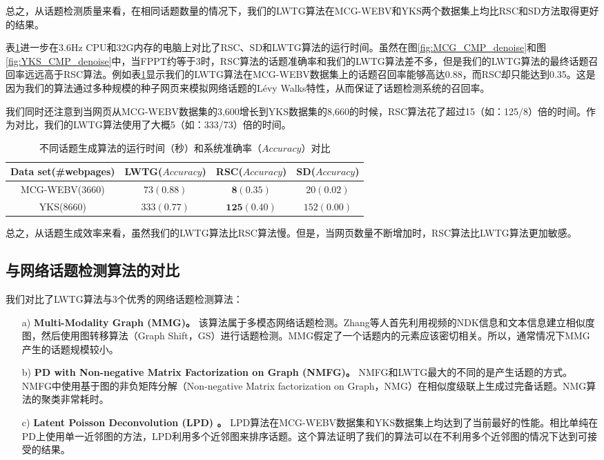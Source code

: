总之，从话题检测质量来看，在相同话题数量的情况下，我们的LWTG算法在MCG-WEBV和YKS两个数据集上均比RSC和SD方法取得更好的结果。

表\ref{tab:denoisy_time_cmp}进一步在3.6Hz CPU和32G内存的电脑上对比了RSC、SD和LWTG算法的运行时间。虽然在图\ref{fig:MCG_CMP_denoise}和图\ref{fig:YKS_CMP_denoise}中，当FPPT约等于3时，RSC算法的话题准确率和我们的LWTG算法差不多，但是我们的LWTG算法的最终话题召回率远远高于RSC算法。例如表\ref{tab:denoisy_time_cmp}显示我们的LWTG算法在MCG-WEBV数据集上的话题召回率能够高达0.88，而RSC却只能达到0.35。这是因为我们的算法通过多种规模的种子网页来模拟网络话题的L\'evy Walks特性，从而保证了话题检测系统的召回率。

我们同时还注意到当网页从MCG-WEBV数据集的3,600增长到YKS数据集的8,660的时候，RSC算法花了超过15（如：125/8）倍的时间。作为对比，我们的LWTG算法使用了大概5（如：333/73）倍的时间。
\begin{table}[!htbp]
    \caption{不同话题生成算法的运行时间（秒）和系统准确率（$Accuracy$）对比}
    \label{tab:denoisy_time_cmp}
    \centering
    \begin{tabular}{|c|c|c|c|}
        \hline
        Data set(\#webpages) & LWTG($Accuracy$) & RSC($Accuracy$) & SD($Accuracy$)\\
        \hline
        \hline
        MCG-WEBV(3660) & $73(\mathbf{0.88})$ & $\mathbf{8}(0.35)$ & $20(0.02)$\\
        \hline
        YKS(8660) & $333(\mathbf{0.77})$ & $\mathbf{125}(0.40)$ & $152(0.00)$\\
        \hline
    \end{tabular}
\end{table}

总之，从话题生成效率来看，虽然我们的LWTG算法比RSC算法慢。但是，当网页数量不断增加时，RSC算法比LWTG算法更加敏感。


\subsection{与网络话题检测算法的对比}

我们对比了LWTG算法与3个优秀的网络话题检测算法：
\begin{enumerate}
  \item[a)] \textbf{Multi-Modality Graph (MMG)\citep{zhang-2013-cross}。} 该算法属于多模态网络话题检测。Zhang等人首先利用视频的NDK信息和文本信息建立相似度图，然后使用图转移算法（Graph Shift，GS）\citep{liu2010graphshift}进行话题检测。MMG假定了一个话题内的元素应该密切相关。所以，通常情况下MMG产生的话题规模较小。
  \item[b)] \textbf{PD with Non-negative Matrix Factorization on Graph
(NMFG)\citep{pang-tao-2018-neurocomputing}。} NMFG和LWTG最大的不同的是产生话题的方式。NMFG中使用基于图的非负矩阵分解（Non-negative Matrix factorization on Graph，NMG\citep{yang2012clustering}）在相似度级联上生成过完备话题。NMG算法的聚类非常耗时。
  \item[c)] \textbf{Latent Poisson Deconvolution (LPD) \citep{pang-tao-2016-lpd}。} LPD算法在MCG-WEBV数据集和YKS数据集上均达到了当前最好的性能。相比单纯在PD上使用单一近邻图的方法，LPD利用多个近邻图来排序话题。这个算法证明了我们的算法可以在不利用多个近邻图的情况下达到可接受的结果。
\end{enumerate}

